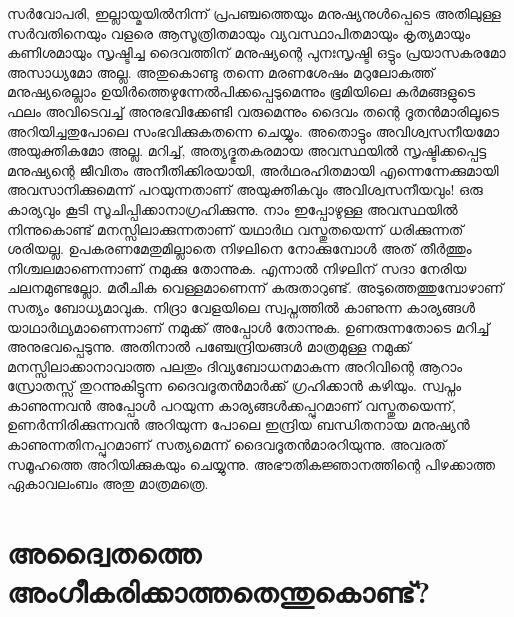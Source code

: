 സര്‍വോപരി, ഇല്ലായ്മയില്‍നിന്ന് പ്രപഞ്ചത്തെയും മനുഷ്യനുള്‍പ്പെടെ അതിലുള്ള സര്‍വതിനെയും വളരെ ആസൂത്രിതമായും വ്യവസ്ഥാപിതമായും കൃത്യമായും കണിശമായും സൃഷ്ടിച്ച ദൈവത്തിന് മനുഷ്യന്റെ പുനഃസൃഷ്ടി ഒട്ടും പ്രയാസകരമോ അസാധ്യമോ അല്ല. അതുകൊണ്ടു തന്നെ മരണശേഷം മറുലോകത്ത് മനുഷ്യരെല്ലാം ഉയിര്‍ത്തെഴുന്നേല്‍പിക്കപ്പെടുമെന്നും ഭൂമിയിലെ കര്‍മങ്ങളുടെ ഫലം അവിടെവച്ച് അനുഭവിക്കേണ്ടി വരുമെന്നും ദൈവം തന്റെ ദൂതന്‍മാരിലൂടെ അറിയിച്ചതുപോലെ സംഭവിക്കുകതന്നെ ചെയ്യും. അതൊട്ടും അവിശ്വസനീയമോ അയുക്തികമോ അല്ല. മറിച്ച്, അത്യദ്ഭുതകരമായ അവസ്ഥയില്‍ സൃഷ്ടിക്കപ്പെട്ട മനുഷ്യന്റെ ജീവിതം അനീതിക്കിരയായി, അര്‍ഥരഹിതമായി എന്നെന്നേക്കുമായി അവസാനിക്കുമെന്ന് പറയുന്നതാണ് അയുക്തികവും അവിശ്വസനീയവും!
ഒരു കാര്യവും കൂടി സൂചിപ്പിക്കാനാഗ്രഹിക്കുന്നു. നാം ഇപ്പോഴുള്ള അവസ്ഥയില്‍ നിന്നുകൊണ്ട് മനസ്സിലാക്കുന്നതാണ് യഥാര്‍ഥ വസ്തുതയെന്ന് ധരിക്കുന്നത് ശരിയല്ല. ഉപകരണമേതുമില്ലാതെ നിഴലിനെ നോക്കുമ്പോള്‍ അത് തീര്‍ത്തും നിശ്ചലമാണെന്നാണ് നമുക്കു തോന്നുക. എന്നാല്‍ നിഴലിന് സദാ നേരിയ ചലനമുണ്ടല്ലോ. മരീചിക വെള്ളമാണെന്ന് കരുതാറുണ്ട്. അടുത്തെത്തുമ്പോഴാണ് സത്യം ബോധ്യമാവുക. നിദ്രാ വേളയിലെ സ്വപ്നത്തില്‍ കാണുന്ന കാര്യങ്ങള്‍ യാഥാര്‍ഥ്യമാണെന്നാണ് നമുക്ക് അപ്പോള്‍ തോന്നുക. ഉണരുന്നതോടെ മറിച്ച് അനുഭവപ്പെടുന്നു. അതിനാല്‍ പഞ്ചേന്ദ്രിയങ്ങള്‍ മാത്രമുള്ള നമുക്ക് മനസ്സിലാക്കാനാവാത്ത പലതും ദിവ്യബോധനമാകുന്ന അറിവിന്റെ ആറാം സ്രോതസ്സ് തുറന്നുകിട്ടുന്ന ദൈവദൂതന്‍മാര്‍ക്ക് ഗ്രഹിക്കാന്‍ കഴിയും. സ്വപ്നം കാണുന്നവന്‍ അപ്പോള്‍ പറയുന്ന കാര്യങ്ങള്‍ക്കപ്പുറമാണ് വസ്തുതയെന്ന്, ഉണര്‍ന്നിരിക്കുന്നവന്‍ അറിയുന്ന പോലെ ഇന്ദ്രിയ ബന്ധിതനായ മനുഷ്യന്‍ കാണുന്നതിനപ്പുറമാണ് സത്യമെന്ന് ദൈവദൂതന്‍മാരറിയുന്നു. അവരത് സമൂഹത്തെ അറിയിക്കുകയും ചെയ്യുന്നു. അഭൗതികജ്ഞാനത്തിന്റെ പിഴക്കാത്ത ഏകാവലംബം അതു മാത്രമത്രെ.
\chapter{അദ്വൈതത്തെ അംഗീകരിക്കാത്തതെന്തുകൊണ്ട്? }
